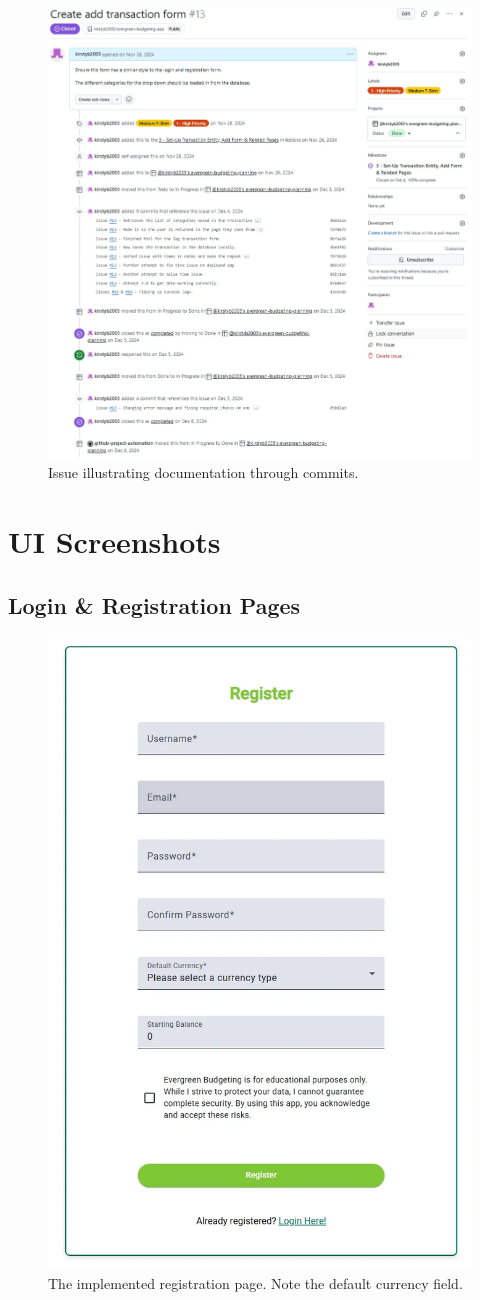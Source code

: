 \documentclass{l4proj}
\begin{document}
\begin{appendices}
\begin{figure}[h]
    \centering
    \includegraphics[width=0.9\linewidth]{images/GitHub-Screenshots/issue-amending-work.png}
    \caption{Issue illustrating documentation through commits.}
    \label{fig:enter-label}
\end{figure}

\chapter{UI Screenshots}
\label{app:ui-screenshots}
\section{Login \& Registration Pages}
\begin{figure}[htb]
    \centering
    \includegraphics[width=0.35\linewidth]{images/UI-Screenshots/registration-page.png}
    \caption{The implemented registration page. Note the default currency field.}
    \label{fig:registration-page}
\end{figure}


\end{appendices}
\end{document}
